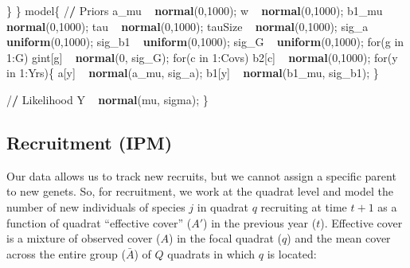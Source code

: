 \documentclass[12pt,]{article}
\newenvironment{Shaded}{\begin{snugshade}}{\end{snugshade}}
\newcommand{\KeywordTok}[1]{\textcolor[rgb]{0.13,0.29,0.53}{\textbf{{#1}}}}
\newcommand{\DecValTok}[1]{\textcolor[rgb]{0.00,0.00,0.81}{{#1}}}
\newcommand{\StringTok}[1]{\textcolor[rgb]{0.31,0.60,0.02}{{#1}}}
\newcommand{\ErrorTok}[1]{\textbf{{#1}}}
\newcommand{\NormalTok}[1]{{#1}}
\begin{document}
\begin{Shaded}
\begin{Highlighting}[]
  \NormalTok{\}}
\NormalTok{\}}
\NormalTok{model\{}
  \NormalTok{/}\ErrorTok{/}\StringTok{ }\NormalTok{Priors}
  \NormalTok{a_mu ~}\StringTok{ }\KeywordTok{normal}\NormalTok{(}\DecValTok{0}\NormalTok{,}\DecValTok{1000}\NormalTok{);}
  \NormalTok{w ~}\StringTok{ }\KeywordTok{normal}\NormalTok{(}\DecValTok{0}\NormalTok{,}\DecValTok{1000}\NormalTok{);}
  \NormalTok{b1_mu ~}\StringTok{ }\KeywordTok{normal}\NormalTok{(}\DecValTok{0}\NormalTok{,}\DecValTok{1000}\NormalTok{);}
  \NormalTok{tau ~}\StringTok{ }\KeywordTok{normal}\NormalTok{(}\DecValTok{0}\NormalTok{,}\DecValTok{1000}\NormalTok{);}
  \NormalTok{tauSize ~}\StringTok{ }\KeywordTok{normal}\NormalTok{(}\DecValTok{0}\NormalTok{,}\DecValTok{1000}\NormalTok{);}
  \NormalTok{sig_a ~}\StringTok{ }\KeywordTok{uniform}\NormalTok{(}\DecValTok{0}\NormalTok{,}\DecValTok{1000}\NormalTok{);}
  \NormalTok{sig_b1 ~}\StringTok{ }\KeywordTok{uniform}\NormalTok{(}\DecValTok{0}\NormalTok{,}\DecValTok{1000}\NormalTok{);}
  \NormalTok{sig_G ~}\StringTok{ }\KeywordTok{uniform}\NormalTok{(}\DecValTok{0}\NormalTok{,}\DecValTok{1000}\NormalTok{);}
  \NormalTok{for(g in }\DecValTok{1}\NormalTok{:G)}
      \NormalTok{gint[g] ~}\StringTok{ }\KeywordTok{normal}\NormalTok{(}\DecValTok{0}\NormalTok{, sig_G);}
  \NormalTok{for(c in }\DecValTok{1}\NormalTok{:Covs)}
    \NormalTok{b2[c] ~}\StringTok{ }\KeywordTok{normal}\NormalTok{(}\DecValTok{0}\NormalTok{,}\DecValTok{1000}\NormalTok{);}
  \NormalTok{for(y in }\DecValTok{1}\NormalTok{:Yrs)\{}
    \NormalTok{a[y] ~}\StringTok{ }\KeywordTok{normal}\NormalTok{(a_mu, sig_a);}
    \NormalTok{b1[y] ~}\StringTok{ }\KeywordTok{normal}\NormalTok{(b1_mu, sig_b1);}
  \NormalTok{\}}

  \NormalTok{/}\ErrorTok{/}\StringTok{ }\NormalTok{Likelihood}
  \NormalTok{Y ~}\StringTok{ }\KeywordTok{normal}\NormalTok{(mu, sigma);}
\NormalTok{\}}
\end{Highlighting}
\end{Shaded}

\subsection{Recruitment (IPM)}\label{recruitment-ipm}

Our data allows us to track new recruits, but we cannot assign a
specific parent to new genets. So, for recruitment, we work at the
quadrat level and model the number of new individuals of species $j$ in
quadrat $q$ recruiting at time $t+1$ as a function of quadrat
``effective cover'' ($A'$) in the previous year ($t$). Effective cover
is a mixture of observed cover ($A$) in the focal quadrat ($q$) and the
mean cover across the entire group ($\bar{A}$) of $Q$ quadrats in which
$q$ is located:
\end{document}
